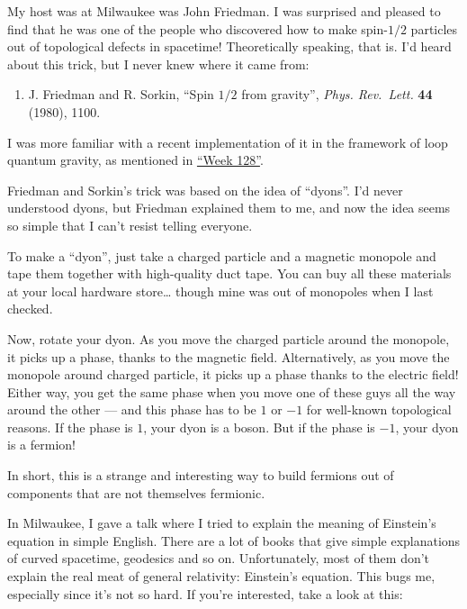 \documentclass{article}
\def\tightlist{}
\renewcommand{\texttt}[1]{%
  \begingroup
  \ttfamily
  \begingroup\lccode`~=`/\lowercase{\endgroup\def~}{/\discretionary{}{}{}}%
  \begingroup\lccode`~=`[\lowercase{\endgroup\def~}{[\discretionary{}{}{}}%
  \begingroup\lccode`~=`.\lowercase{\endgroup\def~}{.\discretionary{}{}{}}%
  \catcode`/=\active\catcode`[=\active\catcode`.=\active
  \scantokens{#1\noexpand}%
  \endgroup
}
\begin{document}
My host was at Milwaukee was John Friedman. I was surprised and pleased
to find that he was one of the people who discovered how to make
spin-\(1/2\) particles out of topological defects in spacetime!
Theoretically speaking, that is. I'd heard about this trick, but I never
knew where it came from:

\begin{enumerate}
\def\labelenumi{\arabic{enumi})}
\setcounter{enumi}{2}
\tightlist
\item
  J. Friedman and R. Sorkin, ``Spin \(1/2\) from gravity'', \emph{Phys.
  Rev.~Lett.} \textbf{44} (1980), 1100.
\end{enumerate}

I was more familiar with a recent implementation of it in the framework
of loop quantum gravity, as mentioned in
\protect\hyperlink{week128}{``Week 128''}.

Friedman and Sorkin's trick was based on the idea of ``dyons''. I'd
never understood dyons, but Friedman explained them to me, and now the
idea seems so simple that I can't resist telling everyone.

To make a ``dyon'', just take a charged particle and a magnetic monopole
and tape them together with high-quality duct tape. You can buy all
these materials at your local hardware store\ldots{} though mine was out
of monopoles when I last checked.

Now, rotate your dyon. As you move the charged particle around the
monopole, it picks up a phase, thanks to the magnetic field.
Alternatively, as you move the monopole around charged particle, it
picks up a phase thanks to the electric field! Either way, you get the
same phase when you move one of these guys all the way around the other
--- and this phase has to be \(1\) or \(-1\) for well-known topological
reasons. If the phase is \(1\), your dyon is a boson. But if the phase
is \(-1\), your dyon is a fermion!

In short, this is a strange and interesting way to build fermions out of
components that are not themselves fermionic.

In Milwaukee, I gave a talk where I tried to explain the meaning of
Einstein's equation in simple English. There are a lot of books that
give simple explanations of curved spacetime, geodesics and so on.
Unfortunately, most of them don't explain the real meat of general
relativity: Einstein's equation. This bugs me, especially since it's not
so hard. If you're interested, take a look at this:

\end{document}
